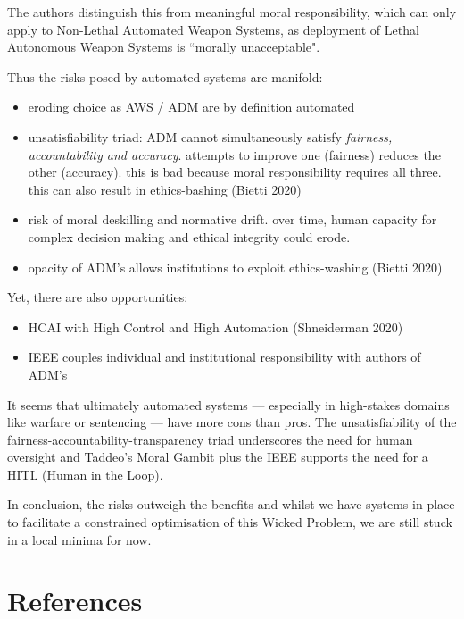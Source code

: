 \documentclass{scrartcl}
\begin{document}
The authors distinguish this from meaningful moral responsibility, which can only apply to Non-Lethal Automated Weapon Systems, as deployment of Lethal Autonomous Weapon Systems is ``morally unacceptable".

Thus the risks posed by automated systems are manifold:

\begin{itemize}
    \item eroding choice as AWS / ADM are by definition automated
    \item unsatisfiability triad: ADM cannot simultaneously satisfy \emph{fairness, accountability and accuracy}. attempts to improve one (fairness) reduces the other (accuracy). this is bad because moral responsibility requires all three. this can also result in ethics-bashing (Bietti 2020)
    \item risk of moral deskilling and normative drift. over time, human capacity for complex decision making and ethical integrity could erode.
    \item opacity of ADM's allows institutions to exploit ethics-washing (Bietti 2020)
\end{itemize}

Yet, there are also opportunities:

\begin{itemize}
    \item HCAI with High Control and High Automation (Shneiderman 2020)
    \item IEEE couples individual and institutional responsibility with authors of ADM's
\end{itemize}

It seems that ultimately automated systems — especially in high-stakes domains like warfare or sentencing — have more cons than pros. The unsatisfiability of the fairness-accountability-transparency triad underscores the need for human oversight and Taddeo's Moral Gambit plus the IEEE supports the need for a HITL (Human in the Loop).

In conclusion, the risks outweigh the benefits and whilst we have systems in place to facilitate a constrained optimisation of this Wicked Problem, we are still stuck in a local minima for now.


\newpage
\section{References}

\nocite{*}
\printbibliography[heading=none]
\end{document}
